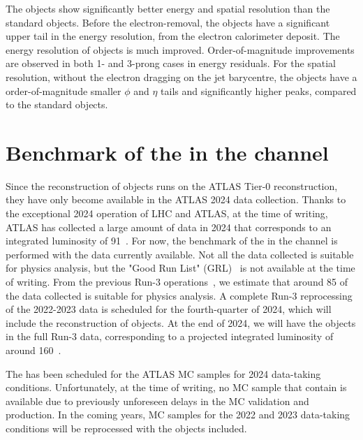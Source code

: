     The \tauhaderm objects show significantly
    better energy and spatial resolution than the standard \tauhad objects. 
    Before the electron-removal, the \tauhad objects have a significant upper tail in the energy resolution,
    from the electron calorimeter deposit. The energy resolution of \tauhaderm objects is much improved. 
    Order-of-magnitude improvements are observed in both 1- and 3-prong cases in energy residuals. 
    For the spatial resolution, without the electron dragging on the \tauseed jet barycentre, the \tauhaderm 
    objects have a order-of-magnitude smaller $\phi$ and $\eta$ tails and significantly higher peaks, 
    compared to the standard \tauhad objects. 
    

\section{Benchmark of the \tauhaderm in the \Zttehad channel}
    \label{sec:erm:benchmark}
    Since the reconstruction of \tauhaderm objects runs on the ATLAS Tier-0 reconstruction, they
    have only become available in the ATLAS 2024 data collection. 
    Thanks to the exceptional 2024 operation of  
    LHC and ATLAS, at the time of writing, ATLAS has collected a large amount of data in 2024 that 
    corresponds to an integrated luminosity of 91~\ifb. 
    For now, the benchmark of the \tauhaderm in the \Zttehad channel is performed with the data currently available. 
    Not all the data collected is suitable for physics analysis, but the "Good Run List" (GRL)~\cite{DAPR-2018-01} 
    is not available at the time of writing. 
    From the previous Run-3 operations~\cite{ATL-DAPR-PUB-2023-001}, we estimate that
    around 85 \ifb of the data collected is suitable for physics analysis.
    A complete Run-3 reprocessing of the 2022-2023 data is scheduled for the fourth-quarter of 2024, 
    which will include the reconstruction of \tauhaderm objects.
    At the end of 2024, we will have the \tauhaderm objects in the full Run-3 data, 
    corresponding to a projected integrated luminosity of around 160~\ifb.

    The \tauhaderm has been scheduled for the ATLAS MC samples for 2024 data-taking conditions.
    Unfortunately, at the time of writing, no MC sample that contain \tauhaderm is available due
    to previously unforeseen delays in the MC validation and production. 
    In the coming years, MC samples for the 2022 and 2023 data-taking conditions will be reprocessed with 
    the \tauhaderm objects included.

